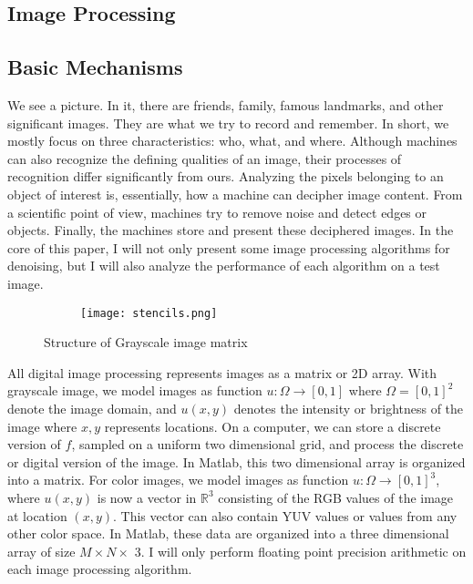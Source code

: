 \documentclass[12pt]{report}
\begin{document}
	\listoffigures
	\begin{tableofcontents}
        \chapter{Image Processing}
			\section{Basic Mechanisms}
We see a picture. In it, there are friends, family, famous landmarks, and other significant images. They are what we try to record and remember. In short, we mostly focus on three characteristics: who, what, and where. Although machines can also recognize the defining qualities of an image, their processes of recognition differ significantly from ours. Analyzing the pixels belonging to an object of interest is, essentially, how a machine can decipher image content. From a scientific point of view, machines try to remove noise and detect edges or objects. Finally, the machines store and present these deciphered images. In the core of this paper, I will not only present some image processing algorithms for denoising, but I will also analyze the performance of each algorithm on a test image.
        	\begin{figure}[ht]
				\centering
				\begin{subfigure}{0.3\textwidth}
					\texttt{[image: stencils.png]}
				\end{subfigure}
				\caption{Structure of Grayscale image matrix}
			\end{figure}
\newline
\par
All digital image processing represents images as a matrix or 2D array. With grayscale image, we model images as function $u:\Omega \to [0,1]$ where $\Omega = [0,1]^2$ denote the image domain, and $u(x,y)$ denotes the intensity or brightness of the image where $x,y$ represents locations. On a computer, we can store a discrete version of $f$, sampled on a uniform two dimensional grid, and process the discrete or digital version of the image. In Matlab, this two dimensional array is organized into a matrix. For color images, we model images as function $u:\Omega \to [0,1]^3$, where $u(x,y)$ is now a vector in $\mathbb{R}^3$ consisting of the RGB values of the image at location $(x,y)$. This vector can also contain YUV values or values from any other color space. In Matlab, these data are organized into a three dimensional array of size $M\times N\times$ 3. I will only perform floating point precision arithmetic on each image processing algorithm.

\end{tableofcontents}
\end{document}
